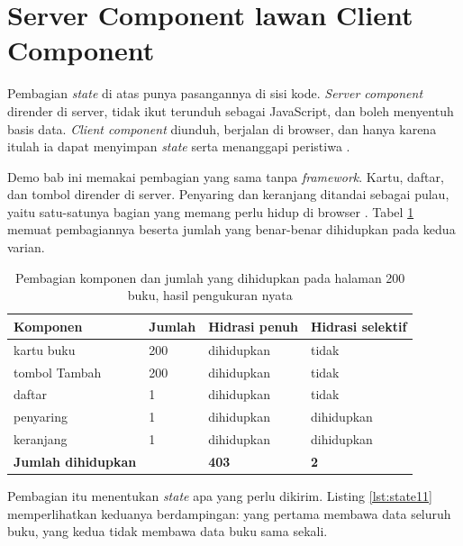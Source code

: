 \section{Server Component lawan Client Component}

Pembagian \textit{state} di atas punya pasangannya di sisi kode.
\textit{Server component} dirender di server, tidak ikut terunduh sebagai
JavaScript, dan boleh menyentuh basis data. \textit{Client component}
diunduh, berjalan di browser, dan hanya karena itulah ia dapat menyimpan
\textit{state} serta menanggapi peristiwa \cite{react-server-components}.

Demo bab ini memakai pembagian yang sama tanpa \textit{framework}. Kartu,
daftar, dan tombol dirender di server. Penyaring dan keranjang ditandai
sebagai pulau, yaitu satu-satunya bagian yang memang perlu hidup di browser
\cite{astro-islands}. Tabel \ref{tab:komponen-sisi} memuat pembagiannya
beserta jumlah yang benar-benar dihidupkan pada kedua varian.

\begin{table}[!htb]
  \centering
  \caption{Pembagian komponen dan jumlah yang dihidupkan pada halaman 200
           buku, hasil pengukuran nyata}
  \label{tab:komponen-sisi}
  \begin{tabularx}{\textwidth}{Xlll}
    \hline
    \textbf{Komponen} & \textbf{Jumlah} & \textbf{Hidrasi penuh} & \textbf{Hidrasi selektif} \\
    \hline
    kartu buku & 200 & dihidupkan & tidak \\
    \hline
    tombol Tambah & 200 & dihidupkan & tidak \\
    \hline
    daftar & 1 & dihidupkan & tidak \\
    \hline
    penyaring & 1 & dihidupkan & dihidupkan \\
    \hline
    keranjang & 1 & dihidupkan & dihidupkan \\
    \hline
    \textbf{Jumlah dihidupkan} & & \textbf{403} & \textbf{2} \\
    \hline
  \end{tabularx}
\end{table}

Pembagian itu menentukan \textit{state} apa yang perlu dikirim. Listing
\ref{lst:state11} memperlihatkan keduanya berdampingan: yang pertama membawa
data seluruh buku, yang kedua tidak membawa data buku sama sekali.

